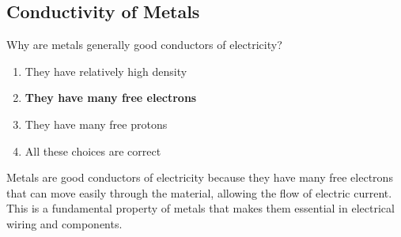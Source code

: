 \subsection{Conductivity of Metals}
\label{T5A07}

\begin{tcolorbox}[colback=gray!10!white,colframe=black!75!black,title=T5A07]
Why are metals generally good conductors of electricity?
\begin{enumerate}[noitemsep]
    \item They have relatively high density
    \item \textbf{They have many free electrons}
    \item They have many free protons
    \item All these choices are correct
\end{enumerate}
\end{tcolorbox}

Metals are good conductors of electricity because they have many free electrons that can move easily through the material, allowing the flow of electric current. This is a fundamental property of metals that makes them essential in electrical wiring and components.